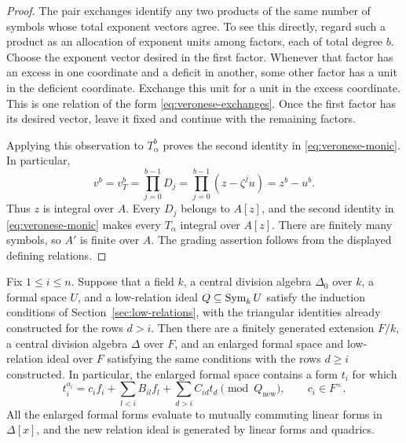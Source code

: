 \begin{proof}
The pair exchanges identify any two products of the same number of
symbols whose total exponent vectors agree.  To see this directly,
regard such a product as an allocation of exponent units among factors,
each of total degree \(b\).  Choose the exponent vector desired in the
first factor.  Whenever that factor has an excess in one coordinate and
a deficit in another, some other factor has a unit in the deficient
coordinate.  Exchange this unit for a unit in the excess coordinate.
This is one relation of the form \eqref{eq:veronese-exchanges}.
Once the first factor has its desired vector, leave it fixed and continue
with the remaining factors.

Applying this observation to \(T_\alpha^b\) proves the second identity in
\eqref{eq:veronese-monic}.  In particular,
\[
 v^b=v_T^b=\prod_{j=0}^{b-1}D_j
       =\prod_{j=0}^{b-1}(z-\zeta^j u)=z^b-u^b.
\]
Thus \(z\) is integral over \(A\).  Every \(D_j\) belongs to \(A[z]\), and
the second identity in \eqref{eq:veronese-monic} makes every \(T_\alpha\)
integral over \(A[z]\).  There are finitely many symbols, so \(A'\) is
finite over \(A\).  The grading assertion follows from the displayed
defining relations.
\end{proof}

\begin{proposition}
\label{prop:induction-step}
Fix \(1\le i\le n\).  Suppose that a field \(k\), a central division algebra
\(\Delta_0\) over \(k\), a formal space \(U\), and a low-relation ideal
\(Q\subseteq\operatorname{Sym}_k U\) satisfy the induction conditions of
Section~\ref{sec:low-relations}, with the triangular identities already
constructed for the rows \(d>i\).
Then there are a finitely generated extension \(F/k\), a central division
algebra \(\Delta\) over \(F\), and an enlarged formal space and low-relation
ideal over \(F\) satisfying the same conditions with the rows \(d\ge i\)
constructed.  In particular, the enlarged formal space contains a form
\(t_i\) for which
\begin{equation}
 t_i^{a_i}
 =c_i f_i+\sum_{l<i}B_{il}f_l+\sum_{d>i}C_{id}t_d
 \pmod{Q_{\mathrm{new}}},
 \qquad c_i\in F^\times.
 \label{eq:new-triangular-row}
\end{equation}
All the enlarged formal forms evaluate to mutually commuting linear forms
in \(\Delta[x]\), and the new relation ideal is generated by linear forms
and quadrics.
\end{proposition}

